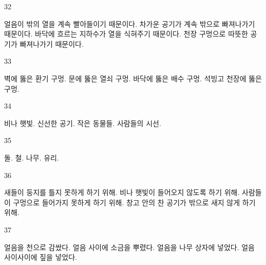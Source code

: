 \documentclass[fs9,seriesFre]{korfarm-base}
\begin{document}
\begin{kfSentenceUnit}{32}{}
\begin{kfChoices}
\kfChoice 얼음이 밖의 열을 계속 빨아들이기 때문이다.
\kfChoice 차가운 공기가 계속 밖으로 빠져나가기 때문이다.
\kfChoice 바닥에 흐르는 지하수가 열을 식혀주기 때문이다.
\kfChoice 천장 구멍으로 따뜻한 공기가 빠져나가기 때문이다.
\end{kfChoices}
\end{kfSentenceUnit}

\begin{kfSentenceUnit}{33}{}
\begin{kfChoices}
\kfChoice 벽에 뚫은 환기 구멍.
\kfChoice 문에 뚫은 열쇠 구멍.
\kfChoice 바닥에 뚫은 배수 구멍.
\kfChoice 석빙고 천장에 뚫은 구멍.
\end{kfChoices}
\end{kfSentenceUnit}

\begin{kfSentenceUnit}{34}{}
\begin{kfChoices}
\kfChoice 비나 햇빛.
\kfChoice 신선한 공기.
\kfChoice 작은 동물들.
\kfChoice 사람들의 시선.
\end{kfChoices}
\end{kfSentenceUnit}

\begin{kfSentenceUnit}{35}{}
\begin{kfChoices}
\kfChoice 돌.
\kfChoice 철.
\kfChoice 나무.
\kfChoice 유리.
\end{kfChoices}
\end{kfSentenceUnit}

\begin{kfSentenceUnit}{36}{}
\begin{kfChoices}
\kfChoice 새들이 둥지를 틀지 못하게 하기 위해.
\kfChoice 비나 햇빛이 들어오지 않도록 하기 위해.
\kfChoice 사람들이 구멍으로 들어가지 못하게 하기 위해.
\kfChoice 창고 안의 찬 공기가 밖으로 새지 않게 하기 위해.
\end{kfChoices}
\end{kfSentenceUnit}

\begin{kfSentenceUnit}{37}{}
\begin{kfChoices}
\kfChoice 얼음을 천으로 감쌌다.
\kfChoice 얼음 사이에 소금을 뿌렸다.
\kfChoice 얼음을 나무 상자에 넣었다.
\kfChoice 얼음 사이사이에 짚을 넣었다.
\end{kfChoices}
\end{kfSentenceUnit}
\end{document}
